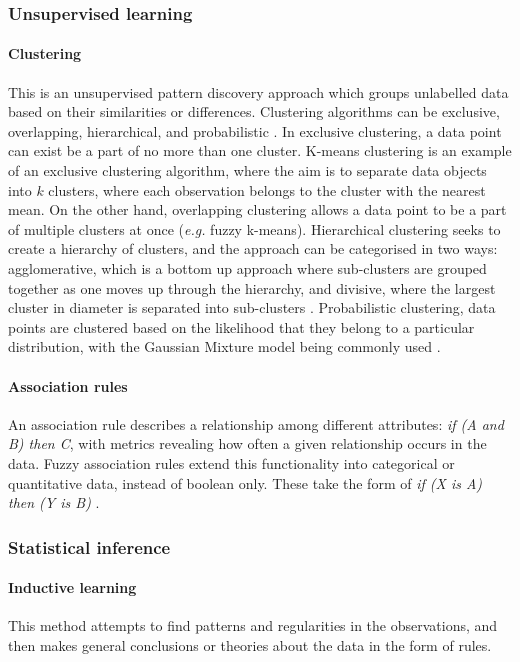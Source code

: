 \subsubsection{Unsupervised learning}

\paragraph{Clustering}
This is an unsupervised pattern discovery approach which groups unlabelled data based on their similarities or differences. Clustering algorithms can be exclusive, overlapping, hierarchical, and probabilistic \citep{IBM}. In exclusive clustering, a data point can exist be a part of no more than one cluster. K-means clustering is an example of an exclusive clustering algorithm, where the aim is to separate data objects into $k$ clusters, where each observation belongs to the cluster with the nearest mean. On the other hand, overlapping clustering allows a data point to be a part of multiple clusters at once (\textit{e.g.} fuzzy k-means). Hierarchical clustering seeks to create a hierarchy of clusters, and the approach can be categorised in two ways: agglomerative, which is a bottom up approach where sub-clusters are grouped together as one moves up through the hierarchy, and divisive, where the largest cluster in diameter is separated into sub-clusters \citep{Khraisat2019}. Probabilistic clustering, data points are clustered based on the likelihood that they belong to a particular distribution, with the Gaussian Mixture model being commonly used \citep{IBM}.

\paragraph{Association rules}
An association rule describes a relationship among different attributes: \emph{if (A and B) then C}, with metrics revealing how often a given relationship occurs in the data. Fuzzy association rules extend this functionality into categorical or quantitative data, instead of boolean only. These take the form of \emph{if (X is A) then (Y is B)} \citep{Buczak2016}.

\subsubsection{Statistical inference}

\paragraph{Inductive learning}
This method attempts to find patterns and regularities in the observations, and then makes general conclusions or theories about the data in the form of rules.

